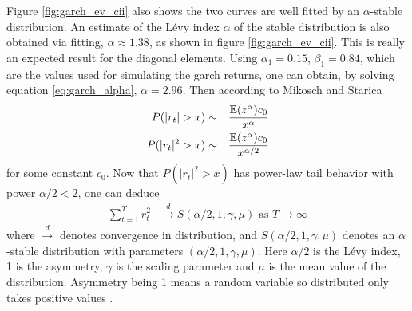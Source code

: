 \documentclass{report}
\begin{document}
Figure \ref{fig:garch_ev_cii} also shows the two curves are well fitted
by an $\alpha$-stable distribution. An estimate of the L\'evy index
$\alpha$ of the stable distribution is also obtained via fitting,
$\alpha \approx 1.38$, as shown in figure \ref{fig:garch_ev_cii}. This
is really an expected result for the diagonal elements. Using
$\alpha_1 = 0.15$, $\beta_1 = 0.84$, which are the values used for
simulating the \gls{garch} returns, one can obtain, by solving equation
\ref{eq:garch_alpha}, $\alpha=2.96$. Then according to Mikosch and Starica
\cite{mikosch2000}
\begin{eqnarray*}
  P(|r_t| > x) &\sim& {\mathbb{E}(z^\alpha) c_0 \over x^\alpha} \\
  P(|r_t|^2 > x) &\sim& {\mathbb{E}(z^\alpha) c_0 \over x^{\alpha/2}} \\
\end{eqnarray*}
for some constant $c_0$. Now that $P(|r_t|^2 > x)$ has power-law tail
behavior with power $\alpha/2 < 2$, one can deduce
\begin{equation}
  \label{eq:stable_CLT}
  \begin{aligned}
    \sum_{t=1}^T r_t^2 &\xrightarrow{d} S(\alpha/2,
    1, \gamma, \mu) \text{ as $T \to \infty$}
  \end{aligned}
\end{equation}
where $\xrightarrow{d}$ denotes convergence in distribution, and
$S(\alpha/2, 1, \gamma, \mu)$ denotes an $\alpha$-stable distribution
with parameters $(\alpha/2, 1, \gamma, \mu)$. Here $\alpha/2$ is the
L\'evy index, 1 is the asymmetry, $\gamma$ is the scaling parameter
and $\mu$ is the mean value of the distribution. Asymmetry being 1
means a random variable so distributed only takes positive values
\cite{Bilik2008, Embrechts1997}.
\end{document}
